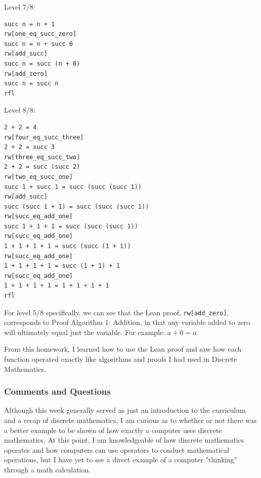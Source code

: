 \documentclass{article}
\theoremstyle{theorem}
\theoremstyle{definition}
\theoremstyle{remark}
\begin{document}
Level 7/8:
\begin{lstlisting}
succ n = n + 1
rw[one_eq_succ_zero]
succ n = n + succ 0
rw[add_succ]
succ n = succ (n + 0)
rw[add_zero]
succ n = succ n
rfl
\end{lstlisting}

Level 8/8:
\begin{lstlisting}
2 + 2 = 4
rw[four_eq_succ_three]
2 + 2 = succ 3
rw[three_eq_succ_two]
2 + 2 = succ (succ 2)
rw[two_eq_succ_one]
succ 1 + succ 1 = succ (succ (succ 1))
rw[add_succ]
succ (succ 1 + 1) = succ (succ (succ 1))
rw[succ_eq_add_one]
succ 1 + 1 + 1 = succ (succ (succ 1))
rw[succ_eq_add_one]
1 + 1 + 1 + 1 = succ (succ (1 + 1))
rw[succ_eq_add_one]
1 + 1 + 1 + 1 = succ (1 + 1) + 1
rw[succ_eq_add_one]
1 + 1 + 1 + 1 = 1 + 1 + 1 + 1
rfl
\end{lstlisting}

For level 5/8 specifically, we can see that the Lean proof, \texttt{rw[add\_zero]}, corresponds to Proof Algorithm 1: Addition, in that any variable added to zero will ultimately equal just the variable. For example: $a + 0 = a$.

From this homework, I learned how to use the Lean proof and saw how each function operated exactly like algorithms and proofs I had used in Discrete Mathematics.

%
%

\subsubsection*{Comments and Questions}

Although this week generally served as just an introduction to the curriculum and a recap of discrete mathematics, I am curious as to whether or not there was a better example to be shown of how exactly a computer uses discrete mathematics. At this point, I am knowledgeable of how discrete mathematics operates and how computers can use operators to conduct mathematical operations, but I have yet to see a direct example of a computer "thinking" through a math calculation.
\end{document}
